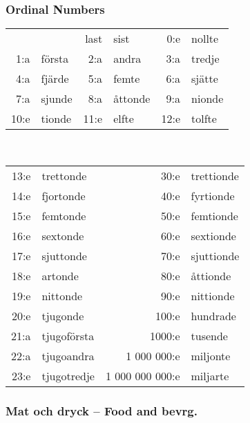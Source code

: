 \documentclass[14pt]{refcard} %
\begin{document}
\subsubsection{Ordinal Numbers}
\vspace{-.5ex}
\begin{tabular}{@{}rl rl rl}
     &         & last & sist    &  0:e & nollte \\
 1:a & första  &  2:a & andra   &  3:a & tredje \\
 4:a & fjärde  &  5:a & femte   &  6:a & sjätte \\
 7:a & sjunde  &  8:a & åttonde &  9:a & nionde \\
10:e & tionde  & 11:e & elfte   & 12:e & tolfte \\
\end{tabular} \\
\begin{tabular}{@{}rl rl}
 13:e & trettonde   &   30:e & trettionde \\
 14:e & fjortonde   &   40:e & fyrtionde  \\
 15:e & femtonde    &   50:e & femtionde  \\
 16:e & sextonde    &   60:e & sextionde  \\
 17:e & sjuttonde   &   70:e & sjuttionde \\
 18:e & artonde     &   80:e & åttionde   \\
 19:e & nittonde    &   90:e & nittionde  \\
 20:e & tjugonde    &  100:e & hundrade  \\
 21:a & tjugoförsta & 1000:e & tusende   \\
 22:a & tjugoandra  & {\footnotesize 1 000 000:e}   & miljonte \\
 23:e & tjugotredje & {\scriptsize 1 000 000 000:e} & miljarte \\
\end{tabular}


\pagebreak

\subsubsection{Mat och dryck -- Food and bevrg.}
\end{document}
